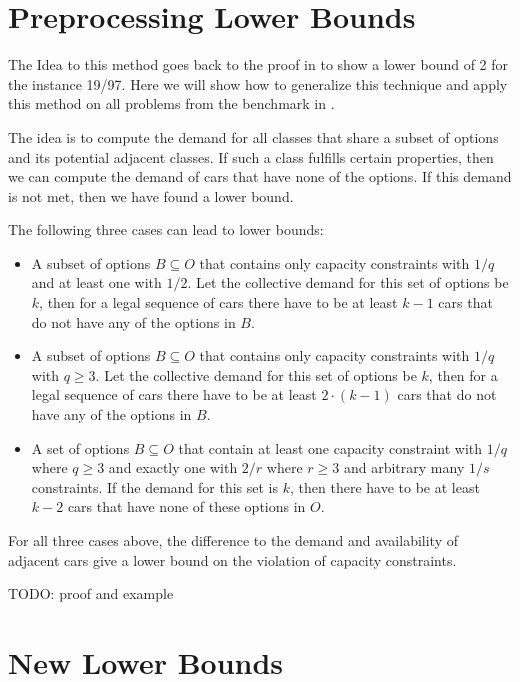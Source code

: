 \documentclass[]{llncs}
\begin{document}
\section{Preprocessing Lower Bounds}

The Idea to this method goes back to the proof in \cite{Gent98} to show a lower bound of 2 for the instance 19/97. Here
we will show how to generalize this technique and apply this method on all problems from the benchmark in \cite{Gravel05}. 

The idea is to compute the demand for all classes that share a subset of options and its potential adjacent classes. If
such a class fulfills certain properties, then we can compute the demand of cars that have none of the options. If this
demand is not met, then we have found a lower bound. 

The following three cases can lead to lower bounds: 

\begin{itemize}
    \item A subset of options $B\subseteq O$ that contains only  capacity constraints with $1/q$ and at least one with
        $1/2$. Let the collective demand for this set of options be $k$, then for a legal sequence of cars there have to
        be at least $k-1$ cars that do not have any of the options in $B$. 
    \item A subset of options $B\subseteq O$ that contains only capacity constraints with $1/q$ with $q \geq 3$. Let the
        collective demand for this set of options be $k$, then for a legal sequence of cars there have to be at least
        $2\cdot (k-1)$ cars that do not have any of the options in $B$. 
    \item A set of options $B\subseteq O$ that contain at least one capacity constraint with $1/q$ where $q \geq 3$ and
        exactly one with $2/r$ where $r \geq 3$ and arbitrary many $1/s$ constraints. If the demand for this set is $k$,
        then there have to be at least $k-2$ cars that have none of these options in $O$. 
\end{itemize}

\begin{proposition}
    For all three cases above, the difference to the demand and availability of adjacent cars give a lower bound on
    the violation of capacity constraints.
\end{proposition}

TODO: proof and example

\section{New Lower Bounds}
\end{document}
